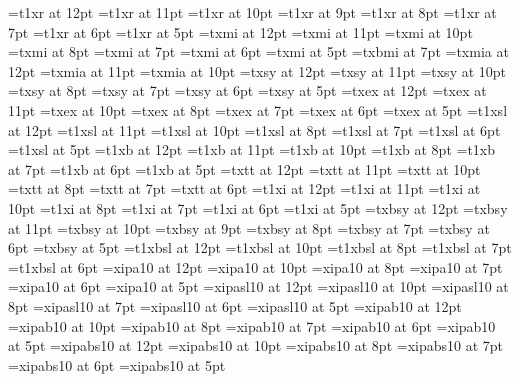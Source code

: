 
\font\twelverm=t1xr at 12pt
\font\elevenrm=t1xr at 11pt
\font\tenrm=t1xr at 10pt
\font\ninerm=t1xr at 9pt
\font\eightrm=t1xr at 8pt
\font\sevenrm=t1xr at 7pt
\font\sixrm=t1xr at 6pt
\font\fiverm=t1xr at 5pt
\font\twelvei=txmi at 12pt
\font\eleveni=txmi at 11pt
\font\teni=txmi at 10pt
\font\eighti=txmi at 8pt
\font\seveni=txmi at 7pt
\font\sixi=txmi at 6pt
\font\fivei=txmi at 5pt
\font\sevenbi=txbmi at 7pt
\font\twelveia=txmia at 12pt
\font\elevenia=txmia at 11pt
\font\tenia=txmia at 10pt
\font\twelvesy=txsy at 12pt
\font\elevensy=txsy at 11pt
\font\tensy=txsy at 10pt
\font\eightsy=txsy at 8pt
\font\sevensy=txsy at 7pt
\font\sixsy=txsy at 6pt
\font\fivesy=txsy at 5pt
\font\twelveex=txex at 12pt
\font\elevenex=txex at 11pt
\font\tenex=txex at 10pt
\font\eightex=txex at 8pt
\font\sevenex=txex at 7pt
\font\sixex=txex at 6pt
\font\fiveex=txex at 5pt
\font\twelvesl=t1xsl at 12pt
\font\elevensl=t1xsl at 11pt
\font\tensl=t1xsl at 10pt
\font\eightsl=t1xsl at 8pt
\font\sevensl=t1xsl at 7pt
\font\sixsl=t1xsl at 6pt
\font\fivesl=t1xsl at 5pt
\font\twelvebf=t1xb at 12pt
\font\elevenbf=t1xb at 11pt
\font\tenbf=t1xb at 10pt
\font\eightbf=t1xb at 8pt
\font\sevenbf=t1xb at 7pt
\font\sixbf=t1xb at 6pt
\font\fivebf=t1xb at 5pt
\font\twelvett=txtt at 12pt
\font\eleventt=txtt at 11pt
\font\tentt=txtt at 10pt
\font\eighttt=txtt at 8pt
\font\seventt=txtt at 7pt
\font\sixtt=txtt at 6pt
\font\twelveit=t1xi at 12pt
\font\elevenit=t1xi at 11pt
\font\tenit=t1xi at 10pt
\font\eightit=t1xi at 8pt
\font\sevenit=t1xi at 7pt
\font\sixit=t1xi at 6pt
\font\fiveit=t1xi at 5pt
\font\twelvebsy=txbsy at 12pt
\font\elevensy=txbsy at 11pt
\font\tenbsy=txbsy at 10pt
\font\ninebsy=txbsy at 9pt
\font\eightbsy=txbsy at 8pt
\font\sevenbsy=txbsy at 7pt
\font\sixbsy=txbsy at 6pt
\font\fivebsy=txbsy at 5pt
\font\twelvebsl=t1xbsl at 12pt
\font\tenbsl=t1xbsl at 10pt
\font\eightbsl=t1xbsl at 8pt
\font\sevenbsl=t1xbsl at 7pt
\font\sixbsl=t1xbsl at 6pt
\font\twelveipr=xipa10 at 12pt
\font\tenipr=xipa10 at 10pt
\font\eightipr=xipa10 at 8pt
\font\sevenipr=xipa10 at 7pt
\font\sixipr=xipa10 at 6pt
\font\fiveipr=xipa10 at 5pt
\font\twelveips=xipasl10 at 12pt
\font\tenips=xipasl10 at 10pt
\font\eightips=xipasl10 at 8pt
\font\sevenips=xipasl10 at 7pt
\font\sixips=xipasl10 at 6pt
\font\fiveips=xipasl10 at 5pt
\font\twelveipb=xipab10 at 12pt
\font\tenipb=xipab10 at 10pt
\font\eightipb=xipab10 at 8pt
\font\sevenipb=xipab10 at 7pt
\font\sixipb=xipab10 at 6pt
\font\fiveipb=xipab10 at 5pt
\font\twelveipbs=xipabs10 at 12pt
\font\tenipbs=xipabs10 at 10pt
\font\eightipbs=xipabs10 at 8pt
\font\sevenipbs=xipabs10 at 7pt
\font\sixipbs=xipabs10 at 6pt
\font\fiveipbs=xipabs10 at 5pt


